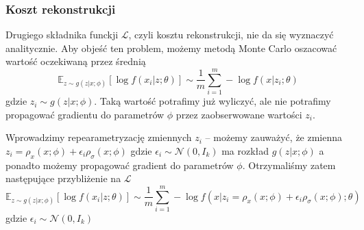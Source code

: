\documentclass[12pt]{extarticle}
\begin{document}
\subsubsection{Koszt rekonstrukcji}
Drugiego składnika funckji $\mathcal{L}$, czyli kosztu rekonstrukcji,
nie da się wyznaczyć analitycznie. Aby objeść ten problem, możemy metodą Monte Carlo
oszacować wartość oczekiwaną przez średnią
$$
\mathbb{E}_{z\sim g(z|x;\phi)}\left[\log f(x_i|z;\theta)\right] \sim
\frac{1}{m} \sum_{i=1}^m -\log f(x|z_i;\theta)
$$
gdzie $z_i \sim g(z|x;\phi)$. Taką wartość potrafimy już wyliczyć, ale nie
potrafimy propagować gradientu do parametrów $\phi$ przez
zaobserwowane wartości $z_i$.

Wprowadzimy repearametryzację zmiennych $z_i$ -- możemy zauważyć, że zmienna
$z_i=\rho_x(x;\phi)+\epsilon_i\rho_\sigma(x;\phi)$
gdzie $\epsilon_i \sim \mathcal{N}(0, I_k)$
ma rozkład $g(z|x;\phi)$ a ponadto możemy propagować gradient do parametrów $\phi$.
Otrzymaliśmy zatem następujące przybliżenie na $\mathcal{L}$
$$
\mathbb{E}_{z\sim g(z|x;\phi)}\left[\log f(x_i|z;\theta)\right] \sim
\frac{1}{m} \sum_{i=1}^m -\log f(x|z_i=\rho_x(x;\phi)+\epsilon_i\rho_\sigma(x;\phi);\theta)
$$
gdzie $\epsilon_i \sim \mathcal{N}(0, I_k)$
\end{document}
